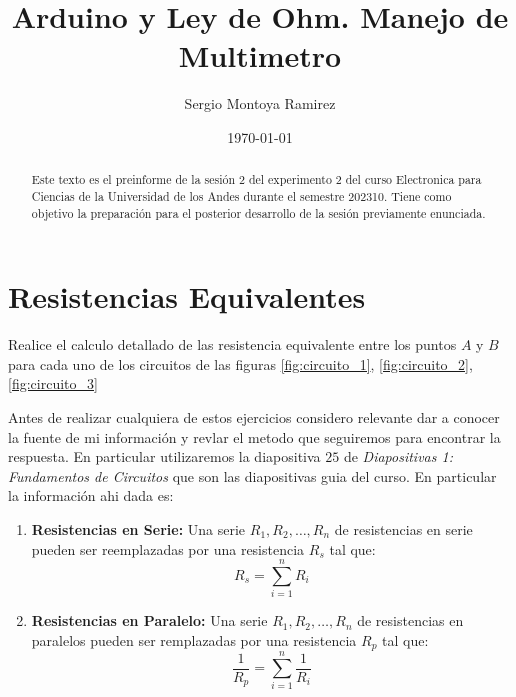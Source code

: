 \documentclass[a4paper, amsfonts, amssymb, amsmath, reprint, showkeys, nofootinbib, twoside]{revtex4-1}
\begin{document}
\title{Arduino y Ley de Ohm. Manejo de Multimetro}


\author{Sergio Montoya Ramirez}

  


\date{\today} %

\begin{abstract}

  Este texto es el preinforme de la sesión 2 del experimento 2 del curso Electronica para Ciencias de la Universidad de los Andes durante el semestre 202310. Tiene como objetivo la preparación para el posterior desarrollo de la sesión previamente enunciada.

\end{abstract}

\maketitle

\section{Resistencias Equivalentes}

Realice el calculo detallado de las resistencia equivalente entre los puntos $A$ y $B$ para cada uno de los circuitos de las figuras \ref{fig:circuito_1}, \ref{fig:circuito_2}, \ref{fig:circuito_3}

Antes de realizar cualquiera de estos ejercicios considero relevante dar a conocer la fuente de mi información y revlar el metodo que seguiremos para encontrar la respuesta. En particular utilizaremos la diapositiva $25$ de \textit{Diapositivas 1: Fundamentos de Circuitos} que son las diapositivas guia del curso. En particular la información ahi dada es:
\begin{enumerate}
  \item \textbf{Resistencias en Serie: } Una serie $R_1,R_2,\ldots,R_n$ de resistencias en serie pueden ser reemplazadas por una resistencia $R_s$ tal que:
  \begin{equation}
    R_s = \sum_{i=1}^{n} R_i \label{eq:Rs} \end{equation}
\item \textbf{Resistencias en Paralelo: } Una serie $R_1,R_2,\ldots,R_n$ de resistencias en paralelos pueden ser remplazadas por una resistencia $R_p$ tal que: 
  \begin{equation}
    \frac{1}{R_p}=\sum_{i=1}^{n} \frac{1}{R_i} \label{eq:Rp}
  \end{equation}
\end{enumerate}
\end{document}
